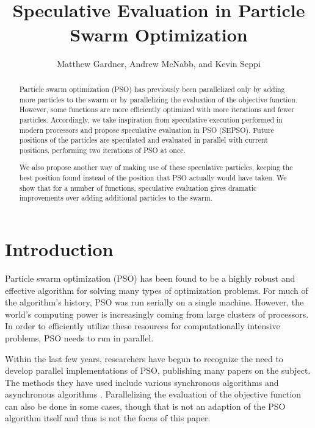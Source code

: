 \documentclass{llncs}
\title{\ \\ \LARGE\bf Speculative Evaluation in Particle Swarm Optimization%
}
\date{}
\author{Matthew Gardner, Andrew McNabb, and Kevin Seppi}
\institute{Department of Computer Science, Brigham Young University}
\begin{document}
\maketitle

\begin{abstract}

Particle swarm optimization (PSO) has previously been parallelized only by
adding more particles to the swarm or by parallelizing the evaluation of the
objective function.  However, some functions are more efficiently optimized
with more iterations and fewer particles.  Accordingly, we take inspiration
from speculative execution performed in modern processors and propose
speculative evaluation in PSO (SEPSO).  Future positions of the particles are
speculated and evaluated in parallel with current positions, performing two
iterations of PSO at once.

We also propose another way of making use of these speculative particles,
keeping the best position found instead of the position that PSO actually would
have taken.  We show that for a number of functions, speculative evaluation
gives dramatic improvements over adding additional particles to the swarm.

\end{abstract}

\section{Introduction}
\label{sec:intro}

Particle swarm optimization (PSO) has been found to be a highly robust and
effective algorithm for solving many types of optimization problems.  For much
of the algorithm's history, PSO was run serially on a single machine.  However,
the world's computing power is increasingly coming from large clusters of
processors.  In order to efficiently utilize these resources for
computationally intensive problems, PSO needs to run in parallel.

Within the last few years, researchers have begun to recognize the need to
develop parallel implementations of PSO, publishing many papers on the subject.
The methods they have used include various synchronous algorithms
\cite{belal-2004-parallel-models-for-pso,
schutte-2004-parallel-global-optimization-with-pso} and asynchronous algorithms
\cite{mostaghim-2006-multi-objective-pso-on-grids,
venter-2005-parallel-pso-asynchronous-evaluations,
koh-2006-parallel-asynchronous-pso}.  Parallelizing the
evaluation of the objective function can also be done in some cases, though
that is not an adaption of the PSO algorithm itself and thus is not the focus
of this paper.
\end{document}
